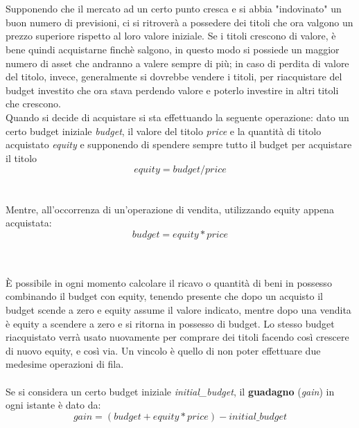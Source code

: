\documentclass[a4paper,12pt]{report}
\begin{document}
\\~\\
Supponendo che il mercato ad un certo punto cresca e si abbia "indovinato" un buon numero di previsioni, ci si ritroverà a possedere dei titoli che ora valgono un prezzo superiore rispetto al loro valore iniziale. Se i titoli crescono di valore, è bene quindi acquistarne finchè salgono, in questo modo si possiede un maggior numero di asset che andranno a valere sempre di più; in caso di perdita di valore del titolo, invece, generalmente si dovrebbe vendere i titoli, per riacquistare del budget investito che ora stava perdendo valore e poterlo investire in altri titoli che crescono.\\
Quando si decide di acquistare si sta effettuando la seguente operazione: dato un certo budget iniziale \textit{budget}, il valore del titolo \textit{price} e la quantità di titolo acquistato \textit{equity} e supponendo di spendere sempre tutto il budget per acquistare il titolo
\\

\begin{equation}
equity=budget/price
\end{equation}
\\~\\
Mentre, all'occorrenza di un'operazione di vendita, utilizzando equity appena acquistata:\\

\begin{equation}
budget=equity*price
\end{equation}

\\~\\
È possibile in ogni momento calcolare il ricavo o quantità di beni in possesso combinando il budget con equity, tenendo presente che dopo un acquisto il budget scende a zero e equity assume il valore indicato, mentre dopo una vendita è equity a scendere a zero e si ritorna in possesso di budget. Lo stesso budget riacquistato verrà usato nuovamente per comprare dei titoli facendo così crescere di nuovo equity, e così via. Un vincolo è quello di non poter effettuare due medesime operazioni di fila. 
\\~\\
Se si considera un certo budget iniziale \textit{initial\_budget}, il \textbf{guadagno} (\textit{gain}) in ogni istante è dato da:
\\
\begin{equation}
gain=(budget+equity*price)-initial\_budget
\end{equation}
\end{document}
